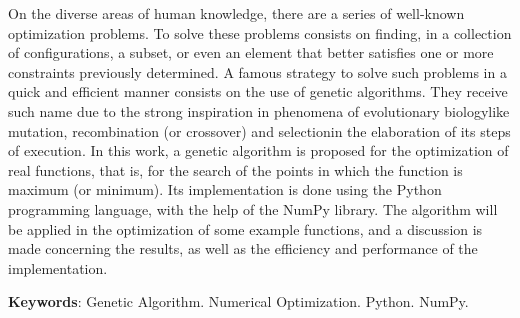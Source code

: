 On the diverse areas of human knowledge, there are a series of well-known optimization
problems. To solve these problems consists on finding, in a collection of configurations,
a subset, or even an element that better satisfies one or more constraints previously determined. A
famous strategy to solve such problems in a quick and efficient manner consists on the use of
genetic algorithms. They receive such name due to the strong inspiration in phenomena of
evolutionary biology\trav like mutation, recombination (or crossover) and selection\trav in the
elaboration of its steps of execution. In this work, a genetic algorithm is proposed for the
optimization of real functions, that is, for the search of the points in which the function is
maximum (or minimum). Its implementation is done using the Python programming language, with the help of the NumPy library.
The algorithm will be applied in the optimization of some example functions, and a discussion
is made concerning the results, as well as the efficiency and performance of the implementation.

\vspace{\onelineskip}\noindent
\textbf{Keywords}: Genetic Algorithm. Numerical Optimization. Python. NumPy.
